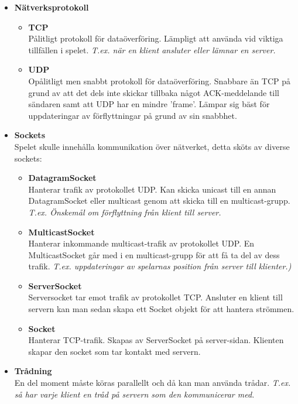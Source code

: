 \documentclass[10pt, titlepage, oneside, a4paper]{article}
\begin{document}
        \begin{itemize}
        	\item \textbf{Nätverksprotokoll} 
        		\begin{itemize}
        			\item \textbf{TCP} \\ Pålitligt protokoll för dataöverföring. Lämpligt att använda vid viktiga tillfällen i spelet. \textit{T.ex. när en klient ansluter eller lämnar en server.}
        			\item \textbf{UDP} \\ Opålitligt men snabbt protokoll för dataöverföring. Snabbare än TCP på grund av att det dels inte skickar tillbaka något ACK-meddelande till sändaren samt att UDP har en mindre 'frame'. Lämpar sig bäst för uppdateringar av förflyttningar på grund av sin snabbhet.
        		\end{itemize}
            \item \textbf{Sockets} \\
            Spelet skulle innehålla kommunikation över nätverket, detta sköts av diverse sockets:
            	\begin{itemize}
            		\item \textbf{DatagramSocket} \\Hanterar trafik av protokollet UDP. Kan skicka unicast till en annan DatagramSocket eller multicast genom att skicka till en multicast-grupp. \textit{T.ex. Önskemål om förflyttning från klient till server.}
            		
            		\item \textbf{MulticastSocket} \\Hanterar inkommande multicast-trafik av protokollet UDP. En MulticastSocket går med i en multicast-grupp för att få ta del av dess trafik. \textit{T.ex. uppdateringar av spelarnas position från server till klienter.)}
            		\item \textbf{ServerSocket} \\Serversocket tar emot trafik av protokollet TCP. Ansluter en klient till servern kan man sedan skapa ett Socket objekt för att hantera strömmen.
            		\item \textbf{Socket} \\ Hanterar TCP-trafik. Skapas av ServerSocket på server-sidan. Klienten skapar den socket som tar kontakt med servern.
            		
            	\end{itemize}
          	
			\item \textbf{Trådning} \\En del moment måste köras parallellt och då kan man använda trådar. \textit{T.ex. så har varje klient en tråd på servern som den kommunicerar med.}
        \end{itemize}
        \newpage
        
\end{document}
